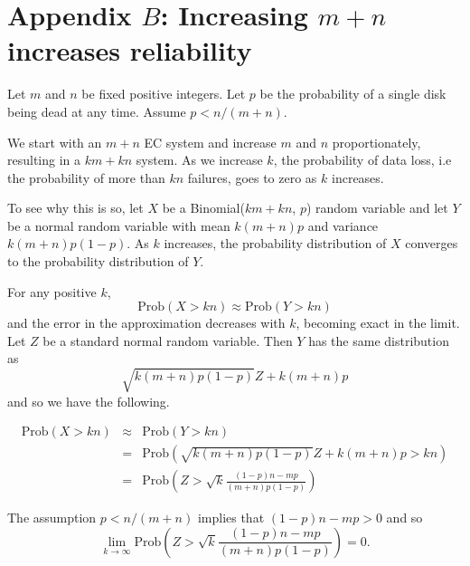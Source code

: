 \section{Appendix $B$: Increasing $m+n$ increases reliability} 

Let $m$ and $n$ be fixed positive integers. Let $p$ be the probability of a single disk being dead at any time. Assume $p < n/(m+n)$.

We start with an $m+n$ EC system and increase $m$ and $n$ proportionately, resulting in a $km + kn$ system. As we increase $k$, the probability of data loss, i.e the probability of more than $kn$ failures, goes to zero as $k$ increases.

To see why this is so, let $X$ be a Binomial($km + kn$, $p$) random variable and let $Y$ be a normal random variable with mean $k(m+n)p$ and variance $k(m+n)p(1-p)$. As $k$ increases, the probability distribution of $X$ converges to the probability distribution of $Y$. 

For any positive $k$, 
\[ \mathrm{Prob}(X > kn) \approx \mathrm{Prob}(Y > kn) \]
and the error in the approximation decreases with $k$, becoming exact in the limit. Let $Z$ be a standard normal random variable. Then $Y$ has the same distribution as 
\[\sqrt{k(m+n)p(1-p)} Z  + k(m+n)p\]
and so we have the following.

\begin{eqnarray*}
\mathrm{Prob}(X > kn) &\approx& \mathrm{Prob}(Y > kn) \\
&=& \mathrm{Prob}(\sqrt{k(m+n)p(1-p)} Z + k(m+n)p > kn) \\
&=& \mathrm{Prob}\left(Z > \sqrt{k} \frac{(1-p)n - mp}{(m+n)p(1-p)}\right) 
\end{eqnarray*}

The assumption $p < n/(m+n)$ implies that $(1-p)n - mp > 0$ and so 
\[ \lim_{k\to\infty} \mathrm{Prob}\left(Z > \sqrt{k} \frac{(1-p)n - mp}{(m+n)p(1-p)}\right) = 0.\]

